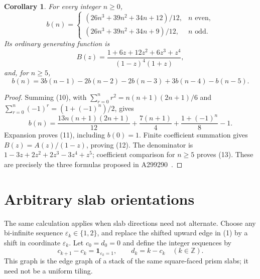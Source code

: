 \documentclass[10pt]{article}
\newtheorem{corollary}[theorem]{Corollary}
\newcommand{\Z}{\mathbb Z}
\begin{document}
\begin{corollary}\label{partial}
For every integer $n\geq0$,
\[
 b(n)=\begin{cases}
 (26n^3+39n^2+34n+12)/12,&n\text{ even},\\
 (26n^3+39n^2+34n+9)/12,&n\text{ odd}.
 \end{cases}                                                    \tag{11}
\]
Its ordinary generating function is
\[
 B(z)=\frac{1+6z+12z^2+6z^3+z^4}{(1-z)^4(1+z)},             \tag{12}
\]
and, for $n\geq5$,
\[
 b(n)=3b(n-1)-2b(n-2)-2b(n-3)+3b(n-4)-b(n-5).              \tag{13}
\]
\end{corollary}
\begin{proof}
Summing (10), with
$\sum_{r=0}^n r^2=n(n+1)(2n+1)/6$ and
$\sum_{r=0}^n(-1)^r=(1+(-1)^n)/2$, gives
\[
 b(n)=\frac{13n(n+1)(2n+1)}{12}+
       \frac{7(n+1)}4+\frac{1+(-1)^n}{8}-1.
\]
Expansion proves (11), including $b(0)=1$.
Finite coefficient summation gives $B(z)=A(z)/(1-z)$, proving (12).
The denominator is $1-3z+2z^2+2z^3-3z^4+z^5$; coefficient comparison
for $n\geq5$ proves (13). These are precisely the three formulas
proposed in A299290~\cite{balls}.
\end{proof}

\section{Arbitrary slab orientations}
The same calculation applies when slab directions need not alternate.
Choose any bi-infinite sequence $\varepsilon_k\in\{1,2\}$, and replace
the shifted upward edge in (1) by a shift in coordinate
$\varepsilon_k$. Let $c_0=d_0=0$ and define the integer sequences by
\[
 c_{k+1}-c_k=\mathbf1_{\varepsilon_k=1},\qquad d_k=k-c_k
 \quad(k\in\Z).
\]
This graph is the edge graph of a stack of the same square-faced prism
slabs; it need not be a uniform tiling.
\end{document}
